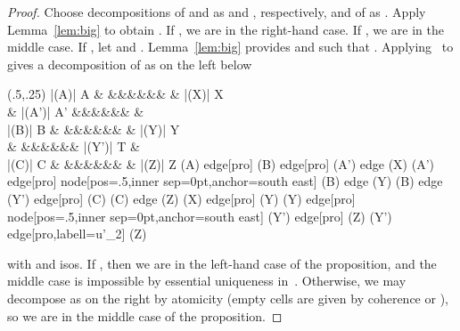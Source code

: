 \documentclass{LMCS}
\theoremstyle{plain}\newtheorem{satz}[thm]{Satz}
\begin{document}
\begin{proof}
  Choose decompositions of  and  as  and , respectively, and
  of  as . Apply Lemma~\ref{lem:big}
  to obtain . If , we are in the
  right-hand case.  If , we are in the middle case. If , let  and .  Lemma~\ref{lem:big} provides
   and 
  such that .
  Applying~ to  gives a decomposition
  of  as on the left below
  \begin{center}
    \Diag (.5,.25) {     }{|(A)| A \& \&\&\&\&\&\& \& |(X)| X \\
        \& |(A')| A' \&\&\&\&\&\& \&  \\
        |(B)| B \& \&\&\&\&\&\& \& |(Y)| Y \\
        \& \&\&\&\&\&\& |(Y')| T \&  \\
        |(C)| C \& \&\&\&\&\&\& \& |(Z)| Z }{(A) edge[pro] (B) edge[pro] (A') edge (X) (A') edge[pro] node[pos=.5,inner sep=0pt,anchor=south east]
        {} (B) edge (Y) (B) edge (Y') edge[pro] (C) (C) edge (Z) (X) edge[pro] (Y) (Y) edge[pro] node[pos=.5,inner sep=0pt,anchor=south east]
        {} (Y') edge[pro] (Z) (Y') edge[pro,labell={u'_2}] (Z) }
\hfil
\end{center}
with  and  isos. If , then we
are in the left-hand case of the proposition, and the middle case is
impossible by essential uniqueness
in~. Otherwise, we may decompose 
as on the right by atomicity (empty cells are given by coherence or
), so we are in the middle case of the proposition.
\end{proof}
\end{document}
